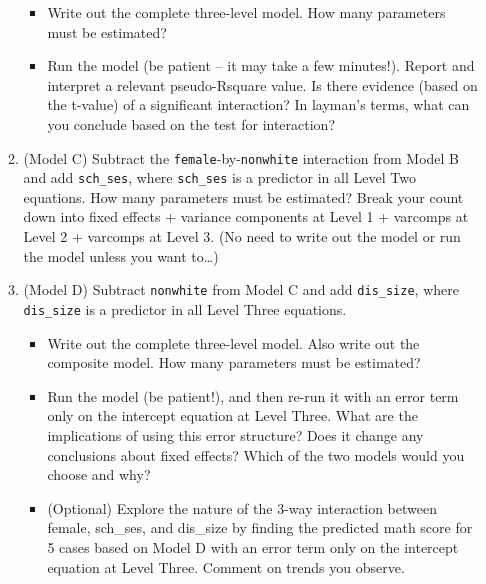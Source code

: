 \documentclass[
]{krantz}
\providecommand{\tightlist}{%
  \setlength{\itemsep}{0pt}\setlength{\parskip}{0pt}}
\begin{document}
\begin{enumerate}
\begin{enumerate}
    \begin{itemize}
    \tightlist
    \item
      Write out the complete three-level model. How many parameters must be estimated?
    \item
      Run the model (be patient -- it may take a few minutes!). Report and interpret a relevant pseudo-Rsquare value. Is there evidence (based on the t-value) of a significant interaction? In layman's terms, what can you conclude based on the test for interaction?
    \end{itemize}
  \item
    (Model C) Subtract the \texttt{female}-by-\texttt{nonwhite} interaction from Model B and add \texttt{sch\_ses}, where \texttt{sch\_ses} is a predictor in all Level Two equations. How many parameters must be estimated? Break your count down into fixed effects + variance components at Level 1 + varcomps at Level 2 + varcomps at Level 3. (No need to write out the model or run the model unless you want to\ldots)
  \item
    (Model D) Subtract \texttt{nonwhite} from Model C and add \texttt{dis\_size}, where \texttt{dis\_size} is a predictor in all Level Three equations.

    \begin{itemize}
    \tightlist
    \item
      Write out the complete three-level model. Also write out the composite model. How many parameters must be estimated?
    \item
      Run the model (be patient!), and then re-run it with an error term only on the intercept equation at Level Three. What are the implications of using this error structure? Does it change any conclusions about fixed effects? Which of the two models would you choose and why?
    \item
      (Optional) Explore the nature of the 3-way interaction between female, sch\_ses, and dis\_size by finding the predicted math score for 5 cases based on Model D with an error term only on the intercept equation at Level Three. Comment on trends you observe.


\end{itemize}
\end{enumerate}
\end{enumerate}
\end{document}
